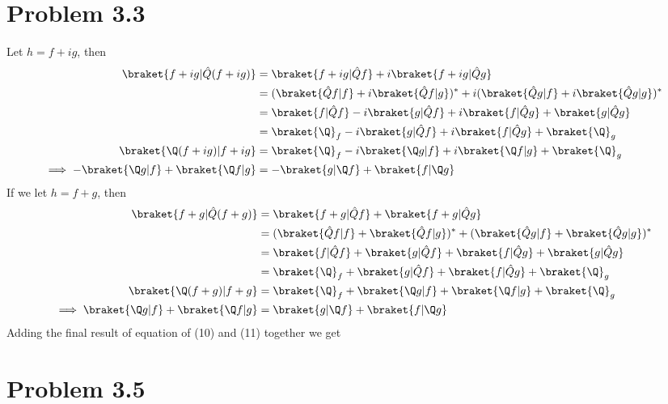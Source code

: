 \section*{Problem 3.3}
Let $h = f+ig$, then
\begin{equation}
    \begin{split}
        \braket{f+ig|\hat{Q}(f+ig)}
        &=\braket{f+ig|\hat{Q}f}+i\braket{f+ig|\hat{Q}g}\\
        &=(\braket{\hat{Q} f|f}+i\braket{\hat{Q}f|g})^\ast+i(\braket{\hat{Q} g|f}+i\braket{\hat{Q}g|g})^\ast\\
        &= \braket{f|\hat{Q}f} -i \braket{g|\hat{Q}f} +i \braket{f|\hat{Q}g} + \braket{g|\hat{Q}g}\\
        &= \braket{\Q}_f -i \braket{g|\hat{Q}f} +i \braket{f|\hat{Q}g} + \braket{\Q}_g\\
        \braket{\Q(f+ig)|f+ig}&= \braket{\Q}_f -i \braket{\Q g|f} +i \braket{\Q f|g} + \braket{\Q}_g\\
        \implies - \braket{\Q g|f} + \braket{\Q f|g} &= - \braket{ g|\Q f} + \braket{ f|\Q g}
    \end{split}
\end{equation}
If we let $h=f+g$, then
\begin{equation}
    \begin{split}
        \braket{f+g|\hat{Q}(f+g)}
        &=\braket{f+g|\hat{Q}f}+\braket{f+g|\hat{Q}g}\\
        &=(\braket{\hat{Q} f|f}+\braket{\hat{Q}f|g})^\ast+(\braket{\hat{Q} g|f}+\braket{\hat{Q}g|g})^\ast\\
        &= \braket{f|\hat{Q}f} + \braket{g|\hat{Q}f} + \braket{f|\hat{Q}g} + \braket{g|\hat{Q}g}\\
        &= \braket{\Q}_f + \braket{g|\hat{Q}f} + \braket{f|\hat{Q}g} + \braket{\Q}_g\\
        \braket{\Q(f+g)|f+g}&= \braket{\Q}_f + \braket{\Q g|f} + \braket{\Q f|g} + \braket{\Q}_g\\
        \implies  \braket{\Q g|f} + \braket{\Q f|g} &=  \braket{ g|\Q f} + \braket{ f|\Q g}
    \end{split}
\end{equation}
Adding the final result of equation of (10) and (11) together we get
\section*{Problem 3.5}
